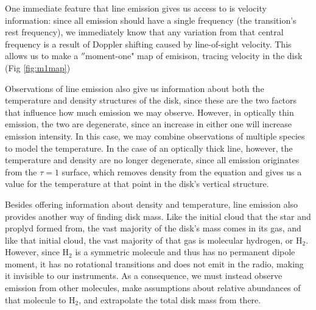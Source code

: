 One immediate feature that line emission gives us access to is velocity information: since all emission should have a single frequency (the transition's rest frequency), we immediately know that any variation from that central frequency is a result of Doppler shifting caused by line-of-sight velocity. This allows us to make a $''$moment-one" map of emisison, tracing velocity in the disk (Fig \ref{fig:m1map})

\begin{figure}[htp]
  \hspace*{\fill}%
  \hfill%
  \hfill%
  \hfill%
  \hfill%
  \hspace*{\fill}%
\end{figure}

Observations of line emission also give us information about both the temperature and density structures of the disk, since these are the two factors that influence how much emission we may observe. However, in optically thin emission, the two are degenerate, since an increase in either one will increase emission intensity. In this case, we may combine observations of multiple species to model the temperature. In the case of an optically thick line, however, the temperature and density are no longer degenerate, since all emission originates from the $\tau=1$ surface, which removes density from the equation and gives us a value for the temperature at that point in the disk's vertical structure.

Besides offering information about density and temperature, line emission also provides another way of finding disk mass. Like the initial cloud that the star and proplyd formed from, the vast majority of the disk's mass comes in its gas, and like that initial cloud, the vast majority of that gas is molecular hydrogen, or H$_2$. However, since H$_2$ is a symmetric molecule and thus has no permanent dipole moment, it has no rotational transitions and does not emit in the radio, making it invisible to our instruments. As a consequence, we must instead observe emission from other molecules, make assumptions about relative abundances of that molecule to H$_2$, and extrapolate the total disk mass from there.

